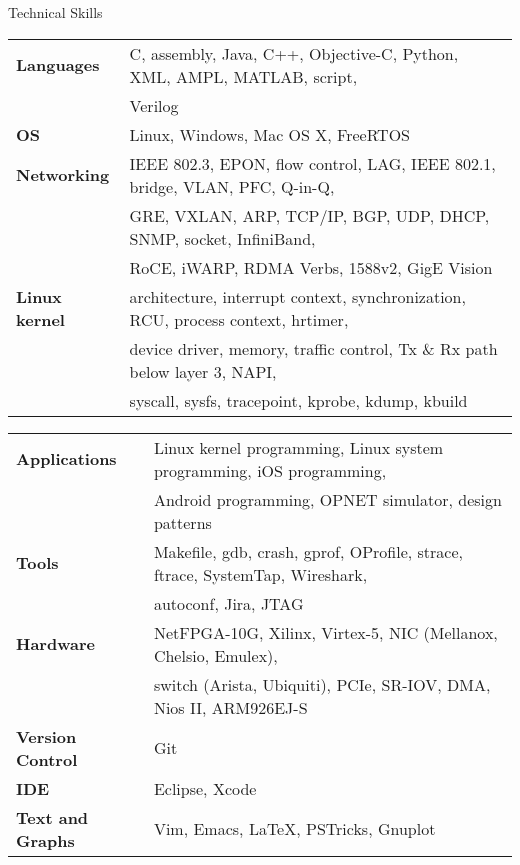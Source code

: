 \documentclass{resume} %
\begin{document}
\begin{rSection}{Technical Skills}

\begin{tabular}{ @{} >{\bfseries}l @{\hspace{6ex}} l }
Languages & C, assembly, Java, C++, Objective-C, Python, XML, AMPL, MATLAB, script, \\
& Verilog \\
OS & Linux, Windows, Mac OS X, FreeRTOS \\
Networking & IEEE 802.3, EPON, flow control, LAG, IEEE 802.1, bridge, VLAN, PFC, Q-in-Q, \\
& GRE, VXLAN, ARP, TCP/IP, BGP, UDP, DHCP, SNMP, socket, InfiniBand, \\
& RoCE, iWARP, RDMA Verbs, 1588v2, GigE Vision \\
Linux kernel & architecture, interrupt context, synchronization, RCU, process context, hrtimer, \\
& device driver, memory, traffic control, Tx \& Rx path below layer 3, NAPI, \\
& syscall, sysfs, tracepoint, kprobe, kdump, kbuild \\
\end{tabular}

\begin{tabular}{ @{} >{\bfseries}l @{\hspace{6ex}} l }
Applications & Linux kernel programming, Linux system programming, iOS programming, \\
& Android programming, OPNET simulator, design patterns \\
Tools & Makefile, gdb, crash, gprof, OProfile, strace, ftrace, SystemTap, Wireshark, \\
& autoconf, Jira, JTAG \\
Hardware & NetFPGA-10G, Xilinx, Virtex-5, NIC (Mellanox, Chelsio, Emulex), \\
& switch (Arista, Ubiquiti), PCIe, SR-IOV, DMA, Nios II, ARM926EJ-S \\
Version Control & Git \\
IDE & Eclipse, Xcode  \\
Text and Graphs & Vim, Emacs, \LaTeX, PSTricks, Gnuplot
\end{tabular}

\end{rSection}



\end{document}
